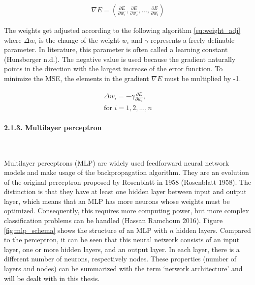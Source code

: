 \documentclass[
]{article}
\begin{document}
\begin{align} \label{eq:gradient_descent}
\nabla{E}=(\frac{\partial E}{\partial w_{1}},
\frac{\partial E}{\partial w_{2}},
\dots,
\frac{\partial E}{\partial w_{i}})
\end{align}

The weights get adjusted according to the following algorithm
\ref{eq:weight_adj} where \(\Delta{w_{i}}\) is the change of the weight
\(w_{i}\) and \(\gamma\) represents a freely definable parameter. In
literature, this parameter is often called a learning constant
(Hunsberger n.d.). The negative value is used because the gradient
naturally points in the direction with the largest increase of the error
function. To minimize the MSE, the elements in the gradient
\(\nabla{E}\) must be multiplied by -1.

\begin{align} \label{eq:weight_adj}
\Delta{w_{i}}=-\gamma\frac{\partial E}{\partial w_{i}}, \\
\text{for } i=1,2,\dots,n \nonumber
\end{align}

\newpage

\hypertarget{MLP}{%
\paragraph{2.1.3. Multilayer perceptron}\label{MLP}}

~

Multilayer perceptrons (MLP) are widely used feedforward neural network
models and make usage of the backpropagation algorithm. They are an
evolution of the original perceptron proposed by Rosenblatt in 1958
(Rosenblatt 1958). The distinction is that they have at least one hidden
layer between input and output layer, which means that an MLP has more
neurons whose weights must be optimized. Consequently, this requires
more computing power, but more complex classification problems can be
handled (Hassan Ramchoun 2016). Figure \ref{fig:mlp_schema} shows the
structure of an MLP with \(n\) hidden layers. Compared to the
perceptron, it can be seen that this neural network consists of an input
layer, one or more hidden layers, and an output layer. In each layer,
there is a different number of neurons, respectively nodes. These
properties (number of layers and nodes) can be summarized with the term
`network architecture' and will be dealt with in this thesis.
\end{document}
